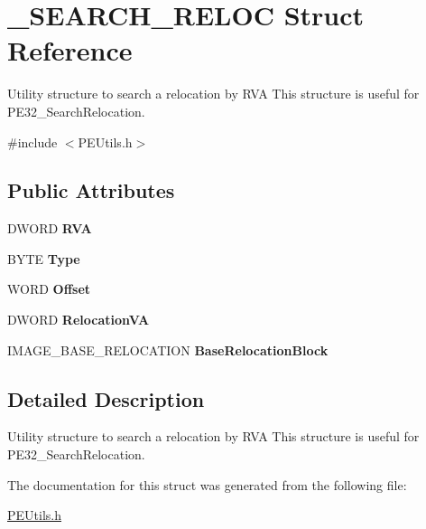 \hypertarget{struct___s_e_a_r_c_h___r_e_l_o_c}{}\section{\+\_\+\+S\+E\+A\+R\+C\+H\+\_\+\+R\+E\+L\+OC Struct Reference}
\label{struct___s_e_a_r_c_h___r_e_l_o_c}


Utility structure to search a relocation by R\+VA This structure is useful for P\+E32\+\_\+\+Search\+Relocation.  




{\ttfamily \#include $<$P\+E\+Utils.\+h$>$}

\subsection*{Public Attributes}
\begin{DoxyCompactItemize}
\item 
\mbox{\label{struct___s_e_a_r_c_h___r_e_l_o_c_af4c2a4e384aae5cf084b49469474c03b}} 
D\+W\+O\+RD {\bfseries R\+VA}
\item 
\mbox{\label{struct___s_e_a_r_c_h___r_e_l_o_c_a31656b01791165d0377fec0a671866aa}} 
B\+Y\+TE {\bfseries Type}
\item 
\mbox{\label{struct___s_e_a_r_c_h___r_e_l_o_c_afc2c97aa45c3beec3b95d2bfd2a0e385}} 
W\+O\+RD {\bfseries Offset}
\item 
\mbox{\label{struct___s_e_a_r_c_h___r_e_l_o_c_ab6d052f8de32f073b4888f3180bad581}} 
D\+W\+O\+RD {\bfseries Relocation\+VA}
\item 
\mbox{\label{struct___s_e_a_r_c_h___r_e_l_o_c_a10cde673635b7ad450d12c72ee63245d}} 
I\+M\+A\+G\+E\+\_\+\+B\+A\+S\+E\+\_\+\+R\+E\+L\+O\+C\+A\+T\+I\+ON {\bfseries Base\+Relocation\+Block}
\end{DoxyCompactItemize}


\subsection{Detailed Description}
Utility structure to search a relocation by R\+VA This structure is useful for P\+E32\+\_\+\+Search\+Relocation. 

The documentation for this struct was generated from the following file\+:\begin{DoxyCompactItemize}
\item 
\mbox{\hyperlink{_p_e_utils_8h}{P\+E\+Utils.\+h}}\end{DoxyCompactItemize}
